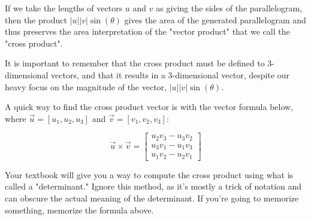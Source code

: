 \documentclass{ximera}
\begin{document}
If we take the lengths of vectors $u$ and $v$ as giving the sides of the parallelogram, then the product $|u||v|\sin(\theta)$ gives the area of the generated parallelogram and thus preserves the area interpretation of the "vector product" that we call the "cross product".

It is important to remember that the cross product must be defined to 3-dimensional vectors, and that it results in a 3-dimensional vector, despite our heavy focus on the magnitude of the vector, $|u||v|\sin(\theta)$.

\begin{definition}
    A quick way to find the cross product vector is with the vector formula below, where $\vec{u}=[u_1,u_2,u_3]$ and $\vec{v}=[v_1,v_2,v_3]$: 

    \[\vec{u}\times \vec{v} = 
    \begin{bmatrix}
    u_2 v_3 - u_3 v_2 \\
    u_3 v_1 - u_1 v_3 \\
    u_1 v_2 - u_2 v_1
    \end{bmatrix}\]
\end{definition}

\begin{remark}
Your textbook will give you a way to compute the cross product using what is called a "determinant." Ignore this method, as it's mostly a trick of notation and can obscure the actual meaning of the determinant. If you're going to memorize something, memorize the formula above.
\end{remark}
\end{document}

